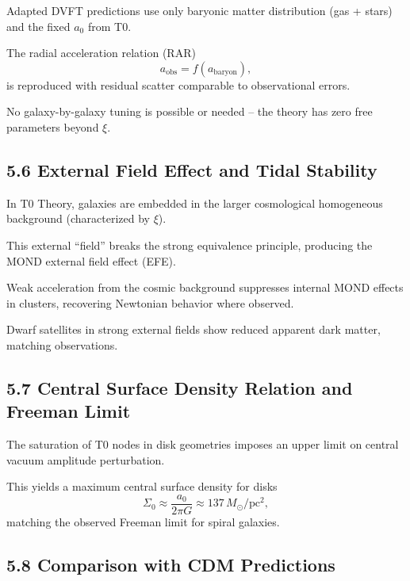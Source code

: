 	Adapted DVFT predictions use only baryonic matter distribution (gas + stars) and the fixed $a_0$ from T0.
	
	The radial acceleration relation (RAR)
	\[
	a_{\text{obs}} = f(a_{\text{baryon}}),
	\]
	is reproduced with residual scatter comparable to observational errors.
	
	No galaxy-by-galaxy tuning is possible or needed – the theory has zero free parameters beyond $\xi$.
	
	\subsection{5.6 External Field Effect and Tidal Stability}
	
	In T0 Theory, galaxies are embedded in the larger cosmological homogeneous background (characterized by $\xi$).
	
	This external ``field'' breaks the strong equivalence principle, producing the MOND external field effect (EFE).
	
	Weak acceleration from the cosmic background suppresses internal MOND effects in clusters, recovering Newtonian behavior where observed.
	
	Dwarf satellites in strong external fields show reduced apparent dark matter, matching observations.
	
	\subsection{5.7 Central Surface Density Relation and Freeman Limit}
	
	The saturation of T0 nodes in disk geometries imposes an upper limit on central vacuum amplitude perturbation.
	
	This yields a maximum central surface density for disks
	\[
	\Sigma_0 \approx \frac{a_0}{2\pi G} \approx 137 \, M_\odot / \text{pc}^2,
	\]
	matching the observed Freeman limit for spiral galaxies.
	
	\subsection{5.8 Comparison with CDM Predictions}
	
